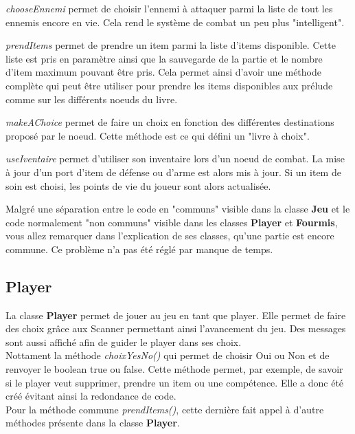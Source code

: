 			\textit{chooseEnnemi} permet de choisir l'ennemi à attaquer parmi la liste de tout les ennemis encore en vie. Cela rend le système de combat un peu plus "intelligent".

			\textit{prendItems} permet de prendre un item parmi la liste d'items disponible. Cette liste est pris en paramètre ainsi que la sauvegarde de la partie et le nombre d'item maximum pouvant être pris. Cela permet ainsi d'avoir une méthode complète qui peut être utiliser pour prendre les items disponibles aux prélude comme sur les différents noeuds du livre.

			\textit{makeAChoice} permet de faire un choix en fonction des différentes destinations proposé par le noeud. Cette méthode est ce qui défini un "livre à choix".

			\textit{useIventaire} permet d'utiliser son inventaire lors d'un noeud de combat. La mise à jour d'un port d'item de défense ou d'arme est alors mis à jour. Si un item de soin est choisi, les points de vie du joueur sont alors actualisée.

			Malgré une séparation entre le code en "communs" visible dans la classe \textbf{Jeu} et le code normalement "non communs" visible dans les classes \textbf{Player} et \textbf{Fourmis}, vous allez remarquer dans l'explication de ses classes, qu'une partie est encore commune. Ce problème n'a pas été réglé par manque de temps.

		\subsection{Player}\label{sub:player}
			La classe \textbf{Player} permet de jouer au jeu en tant que player. Elle permet de faire des choix grâce aux Scanner permettant ainsi l'avancement du jeu. Des messages sont aussi affiché afin de guider le player dans ses choix.\\
			Nottament la méthode \textit{choixYesNo()} qui permet de choisir Oui ou Non et de renvoyer le boolean true ou false. Cette méthode permet, par exemple, de savoir si le player veut supprimer, prendre un item ou une compétence. Elle a donc été créé évitant ainsi la redondance de code.\\

			Pour la méthode commune \textit{prendItems()}, cette dernière fait appel à d'autre méthodes présente dans la classe \textbf{Player}.

